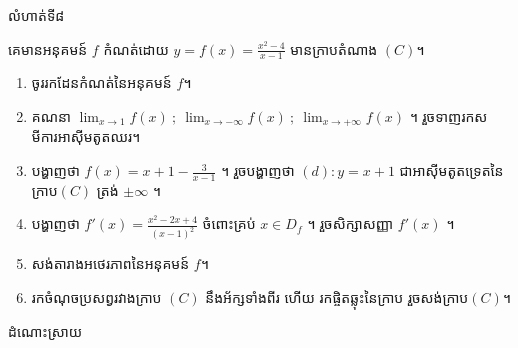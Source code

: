 \documentclass[expologarit]{subfiles}
\begin{document}
\begin{enumerate}[k]
\begin{center}
 \end{center}
\end{enumerate}
\newpage 
\begin{center}
\color{violet} \kml លំហាត់ទី៨
\end{center}
គេមានអនុគមន៍ $f$ កំណត់ដោយ $y=f(x)=\frac{x^2-4}{x-1}$ មានក្រាបតំណាង $(C)$។
\begin{enumerate}[k]
\item ចូររកដែនកំណត់នៃអនុគមន៍ $f$។
\item គណនា $\lim_{x\to 1}f(x)\ ;\ \lim_{x\to -\infty}f(x)\ ;\ \lim_{x\to +\infty}f(x)$ ។ រួចទាញរកសមីការអាស៊ីមតូតឈរ។
\item បង្ហាញថា $f(x)=x+1-\frac{3}{x-1}$ ។ រួចបង្ហាញថា $(d): y=x+1$ ជាអាស៊ីមតូតទ្រេតនៃក្រាប$(C)$ ត្រង់ $\pm\infty$ ។
\item បង្ហាញថា $f'(x)=\frac{x^2-2x+4}{(x-1)^2}$ ចំពោះគ្រប់ $x\in D_f$ ។ រួចសិក្សាសញ្ញា $f'(x)$ ។
\item  សង់តារាងអថេរភាពនៃអនុគមន៍ $f$។ 
\item រកចំណុចប្រសព្វរវាងក្រាប $(C)$ នឹងអ័ក្សទាំងពីរ ហើយ រកផ្ចិតឆ្លុះនៃក្រាប រួចសង់ក្រាប$(C)$។
\end{enumerate}
\begin{center}
\color{violet} \kml ដំណោះស្រាយ
\end{center}
\end{document}
